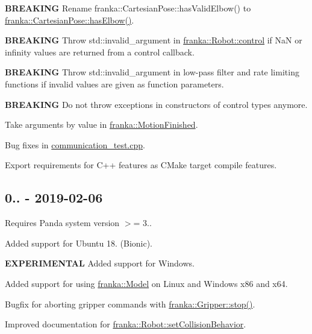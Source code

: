 \begin{DoxyItemize}
\item {\bfseries B\+R\+E\+A\+K\+I\+NG} Rename {\ttfamily franka\+::\+Cartesian\+Pose\+::has\+Valid\+Elbow()} to {\ttfamily \hyperlink{classfranka_1_1CartesianPose_a5fa9f47dbf73ab45f671d89e11f89ccf}{franka\+::\+Cartesian\+Pose\+::has\+Elbow()}}.
\item {\bfseries B\+R\+E\+A\+K\+I\+NG} Throw {\ttfamily std\+::invalid\+\_\+argument} in {\ttfamily \hyperlink{classfranka_1_1Robot_a5b5ba0a4f2bfd20be963b05622e629e1}{franka\+::\+Robot\+::control}} if NaN or infinity values are returned from a control callback.
\item {\bfseries B\+R\+E\+A\+K\+I\+NG} Throw {\ttfamily std\+::invalid\+\_\+argument} in low-\/pass filter and rate limiting functions if invalid values are given as function parameters.
\item {\bfseries B\+R\+E\+A\+K\+I\+NG} Do not throw exceptions in constructors of control types anymore.
\item Take arguments by value in {\ttfamily \hyperlink{namespacefranka_a20791f7142d78bbbe3c957cc66a23ade}{franka\+::\+Motion\+Finished}}.
\item Bug fixes in {\ttfamily \hyperlink{communication__test_8cpp}{communication\+\_\+test.\+cpp}}.
\item Export requirements for C++ features as C\+Make target compile features.
\end{DoxyItemize}

\subsection*{0.. -\/ 2019-\/02-\/06}

Requires Panda system version $>$= 3..


\begin{DoxyItemize}
\item Added support for Ubuntu 18. (Bionic).
\item {\bfseries E\+X\+P\+E\+R\+I\+M\+E\+N\+T\+AL} Added support for Windows.
\item Added support for using {\ttfamily \hyperlink{classfranka_1_1Model}{franka\+::\+Model}} on Linux and Windows x86 and x64.
\item Bugfix for aborting gripper commands with {\ttfamily \hyperlink{classfranka_1_1Gripper_add7397fb6c5631650c139d26a85c8e1d}{franka\+::\+Gripper\+::stop()}}.
\item Improved documentation for {\ttfamily \hyperlink{classfranka_1_1Robot_a168e1214ac36d74ac64f894332b84534}{franka\+::\+Robot\+::set\+Collision\+Behavior}}.
\end{DoxyItemize}

